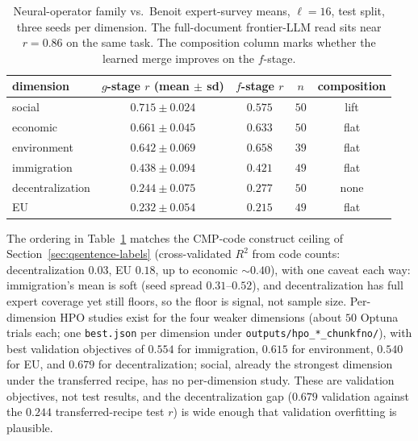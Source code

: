 \begin{table}[htbp]
    \centering
    \begin{tabular}{lcccc}
    \toprule
    dimension & $g$-stage $r$ (mean $\pm$ sd) & $f$-stage $r$ & $n$ & composition \\
    \midrule
    social           & $\mathbf{0.715 \pm 0.024}$ & $0.575$ & $50$ & lift \\
    economic         & $0.661 \pm 0.045$ & $0.633$ & $50$ & flat \\
    environment      & $0.642 \pm 0.069$ & $0.658$ & $39$ & flat \\
    immigration      & $0.438 \pm 0.094$ & $0.421$ & $49$ & flat \\
    decentralization & $0.244 \pm 0.075$ & $0.277$ & $50$ & none \\
    EU               & $0.232 \pm 0.054$ & $0.215$ & $49$ & flat \\
    \bottomrule
    \end{tabular}
    \caption{Neural-operator family vs.\ Benoit expert-survey means,
    $\ell = 16$, test split, three seeds per dimension. The
    full-document frontier-LLM read sits near $r = 0.86$ on the same
    task. The composition column marks whether the learned merge
    improves on the $f$-stage.}
    \label{tab:app-benoit-6dim-fno}
\end{table}

The ordering in Table~\ref{tab:app-benoit-6dim-fno} matches the
CMP-code construct ceiling of Section~\ref{sec:qsentence-labels}
(cross-validated $R^2$ from code counts: decentralization $0.03$, EU
$0.18$, up to economic $\sim 0.40$), with one caveat each way:
immigration's mean is soft (seed spread $0.31$--$0.52$), and
decentralization has full expert coverage yet still floors, so the
floor is signal, not sample size. Per-dimension HPO studies exist for
the four weaker dimensions (about $50$ Optuna trials each; one
\texttt{best.json} per dimension under
\texttt{outputs/hpo\_*\_chunkfno/}), with best validation objectives of
$0.554$ for immigration, $0.615$ for environment, $0.540$ for EU, and
$0.679$ for decentralization; social, already the strongest dimension
under the transferred recipe, has no per-dimension study. These are
validation objectives, not test results, and the decentralization gap
($0.679$ validation against the $0.244$ transferred-recipe test $r$) is
wide enough that validation overfitting is plausible.
